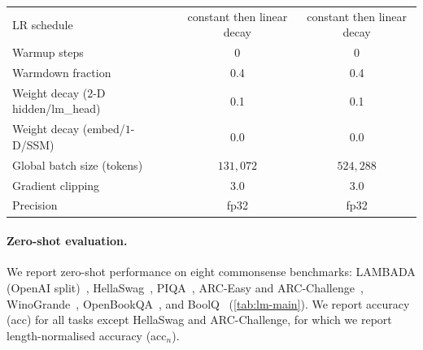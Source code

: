 \documentclass{article}
\begin{document}
\begin{table}[h]
\begin{tabular}{lcc}
LR schedule                          & constant then linear decay & constant then linear decay \\
Warmup steps                         & 0 & 0 \\
Warmdown fraction                    & 0.4 & 0.4 \\
Weight decay ($2$-D hidden/lm\_head) & 0.1 & 0.1 \\
Weight decay (embed/$1$-D/SSM)       & 0.0 & 0.0 \\
Global batch size (tokens)           & $131{,}072$ & $524{,}288$ \\
Gradient clipping                    & 3.0 & 3.0 \\
Precision                            & fp32 & fp32 \\
\bottomrule
\end{tabular}
\end{table}

\paragraph{Zero-shot evaluation.} We report zero-shot performance on eight commonsense benchmarks:
LAMBADA (OpenAI split)~\citep{paperno2016lambada},
HellaSwag~\citep{zellers2019hellaswag}, PIQA~\citep{bisk2020piqa},
ARC-Easy and ARC-Challenge~\citep{clark2018think},
WinoGrande~\citep{sakaguchi2021winogrande},
OpenBookQA~\citep{mihaylov2018can}, and BoolQ~\citep{clark2019boolq}
(\cref{tab:lm-main}). We report accuracy (acc) for all tasks except HellaSwag and
ARC-Challenge, for which we report length-normalised accuracy (acc$_n$).
\end{document}
